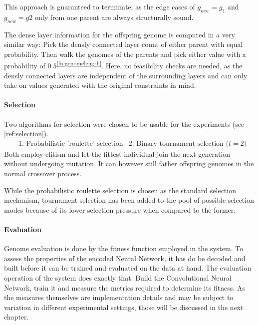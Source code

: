 \documentclass[11pt,a4paper,twoside,openright]{scrbook}
\begin{document}
This approach is guaranteed to terminate, as the edge cases of \(g_{new} = g_{1}\) and \(g_{new} = g{2}\) only from one parent are always structurally sound.

The dense layer information for the offspring genome is computed in a very similar way: Pick the densly connected layer count of either parent with equal probability. Then walk the genomes of the parents and pick either value with a probability of \(0.5\)\textsuperscript{\ref{fn:genomelength}}. Here, no feasibility checks are needed, as the densly connected layers are independent of the surrounding layers and can only take on values generated with the original constraints in mind.

\paragraph{Selection}
Two algorithms for selection were chosen to be usable for the experiments (see \ref{ref:selection}).
\begin{equation*}
  \begin{aligned}
    &\text{1. Probabilistic 'roulette' selection}
    &\text{2. Binary tournament selection (\(t=2\))}
  \end{aligned}
\end{equation*}
Both employ elitism and let the fittest individual join the next generation without undergoing mutation. It can however still father offspring genomes in the normal crossover process.

While the probabilistic roulette selection is chosen as the standard selection mechanism, tournament selection has been added to the pool of possible selection modes because of its lower selection pressure when compared to the former.

\paragraph{Evaluation}
Genome evaluation is done by the fitness function employed in the system. To assess the properties of the encoded Neural Network, it has do be decoded and built before it can be trained and evaluated on the data at hand.
The evaluation operation of the system does exactly that: Build the Convolutional Neural Network, train it and measure the metrics required to determine its fitness. As the measures themselves are implementation details and may be subject to variation in different experimental settings, those will be discussed in the next chapter.
\end{document}
